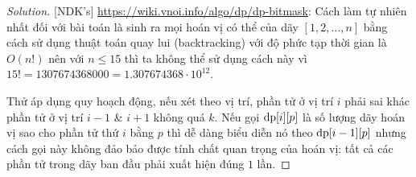 \documentclass{article}
\begin{document}
\begin{proof}[Solution]
    [NDK's] \url{https://wiki.vnoi.info/algo/dp/dp-bitmask}: Cách làm tự nhiên nhất đối với bài toán là sinh ra mọi hoán vị có thể của dãy $[1,2,\ldots,n]$ bằng cách sử dụng thuật toán quay lui (backtracking) với độ phức tạp thời gian  là $O(n!)$ nên với $n\le15$ thì ta không thể sử dụng cách này vì $15! = 1307674368000 = 1.307674368\cdot10^{12}$.

    Thử áp dụng quy hoạch động, nếu xét theo vị trí, phần tử ở vị trí $i$ phải sai khác phần tử ở vị trí $i - 1$ \& $i + 1$ không quá $k$. Nếu gọi ${\rm dp}[i][p]$ là số lượng dãy hoán vị sao cho phần tử thứ $i$ bằng $p$ thì dễ dàng biểu diễn nó theo ${\rm dp}[i - 1][p]$ nhưng cách gọi này không đảo bảo được tính chất quan trọng của hoán vị: tất cả các phần tử trong dãy ban đầu phải xuất hiện đúng $1$ lần.


\end{proof}
\end{document}
